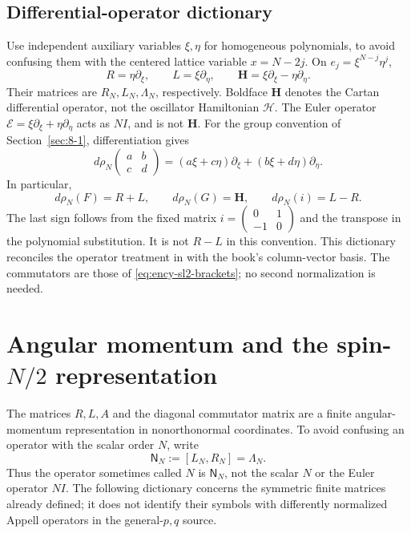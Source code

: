 \subsection{Differential-operator dictionary}
\label{sec:differential-sl2-dictionary}
Use independent auxiliary variables $\xi,\eta$ for homogeneous
polynomials, to avoid confusing them with the centered lattice variable
$x=N-2j$. On $e_j=\xi^{N-j}\eta^j$,
\[
R=\eta\partial_\xi,\qquad L=\xi\partial_\eta,\qquad
\mathbf H=\xi\partial_\xi-\eta\partial_\eta.
\]
Their matrices are $R_N,L_N,\Lambda_N$, respectively. Boldface $\mathbf H$ denotes the Cartan differential operator, not the oscillator Hamiltonian $\mathcal H$. The Euler operator
$\mathcal E=\xi\partial_\xi+\eta\partial_\eta$ acts as $NI$, and is
not $\mathbf H$.
For the group convention of Section~\ref{sec:8-1}, differentiation gives
\[
d\rho_N\!\begin{pmatrix}a&b\\c&d\end{pmatrix}
=(a\xi+c\eta)\partial_\xi+(b\xi+d\eta)\partial_\eta.
\]
In particular,
\[
d\rho_N(F)=R+L,\qquad d\rho_N(G)=\mathbf H,\qquad
d\rho_N(i)=L-R.
\]
The last sign follows from the fixed matrix
$i=\begin{pmatrix}0&1\\-1&0\end{pmatrix}$ and the transpose in the
polynomial substitution. It is not $R-L$ in this convention.
This dictionary reconciles the operator treatment in
\cite[Section~7.4]{KocikFeynman} with the book's column-vector basis.
The commutators are those of \eqref{eq:ency-sl2-brackets}; no second
normalization is needed.

\section{Angular momentum and the spin-$N/2$ representation}
\label{sec:angular-momentum}
The matrices $R,L,A$ and the diagonal commutator matrix are a finite angular-momentum representation in nonorthonormal coordinates. To avoid confusing an operator with the scalar order $N$, write
\[
\mathsf N_N:=[L_N,R_N]=\Lambda_N.
\]
Thus the operator sometimes called $N$ is $\mathsf N_N$, not the scalar $N$ or the Euler operator $NI$. The following dictionary concerns the symmetric finite matrices already defined; it does not identify their symbols with differently normalized Appell operators in the general-$p,q$ source.


